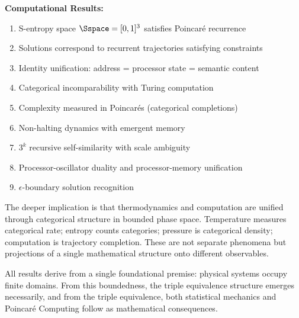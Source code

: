 \textbf{Computational Results:}
\begin{enumerate}
    \item S-entropy space $\Sspace = [0,1]^3$ satisfies Poincar\'e recurrence
    \item Solutions correspond to recurrent trajectories satisfying constraints
    \item Identity unification: address = processor state = semantic content
    \item Categorical incomparability with Turing computation
    \item Complexity measured in Poincar\'es (categorical completions)
    \item Non-halting dynamics with emergent memory
    \item $3^k$ recursive self-similarity with scale ambiguity
    \item Processor-oscillator duality and processor-memory unification
    \item $\epsilon$-boundary solution recognition
\end{enumerate}

The deeper implication is that thermodynamics and computation are unified through categorical structure in bounded phase space. Temperature measures categorical rate; entropy counts categories; pressure is categorical density; computation is trajectory completion. These are not separate phenomena but projections of a single mathematical structure onto different observables.

All results derive from a single foundational premise: physical systems occupy finite domains. From this boundedness, the triple equivalence structure emerges necessarily, and from the triple equivalence, both statistical mechanics and Poincar\'e Computing follow as mathematical consequences.

